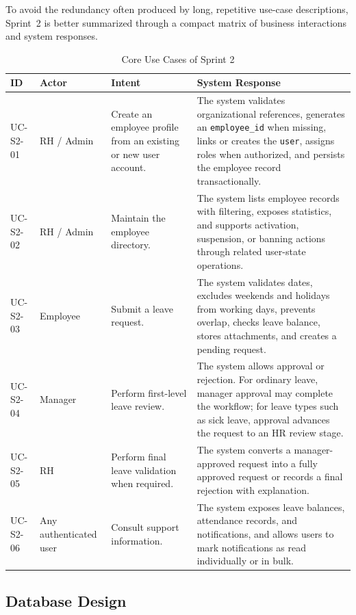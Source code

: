 To avoid the redundancy often produced by long, repetitive use-case descriptions, Sprint~2 is
better summarized through a compact matrix of business interactions and system responses.

\begin{table}[H]
\centering
\small
\renewcommand{\arraystretch}{1.28}
\begin{tabular}{|p{}|p{}|p{}|p{}|}
\hline
\textbf{ID} & \textbf{Actor} & \textbf{Intent} & \textbf{System Response} \\
\hline
\rowcolor{tablerowgray}
UC-S2-01 & RH / Admin & Create an employee profile from an existing or new user account. &
The system validates organizational references, generates an \texttt{employee\_id} when
missing, links or creates the \texttt{user}, assigns roles when authorized, and persists the
employee record transactionally. \\
\hline
UC-S2-02 & RH / Admin & Maintain the employee directory. &
The system lists employee records with filtering, exposes statistics, and supports activation,
suspension, or banning actions through related user-state operations. \\
\hline
\rowcolor{tablerowgray}
UC-S2-03 & Employee & Submit a leave request. &
The system validates dates, excludes weekends and holidays from working days, prevents
overlap, checks leave balance, stores attachments, and creates a pending request. \\
\hline
UC-S2-04 & Manager & Perform first-level leave review. &
The system allows approval or rejection. For ordinary leave, manager approval may complete the
workflow; for leave types such as sick leave, approval advances the request to an HR review
stage. \\
\hline
\rowcolor{tablerowgray}
UC-S2-05 & RH & Perform final leave validation when required. &
The system converts a manager-approved request into a fully approved request or records a final
rejection with explanation. \\
\hline
UC-S2-06 & Any authenticated user & Consult support information. &
The system exposes leave balances, attendance records, and notifications, and allows users to
mark notifications as read individually or in bulk. \\
\hline
\end{tabular}
\caption{Core Use Cases of Sprint 2}
\label{tab:s2_usecases}
\end{table}

\subsection{Database Design}

